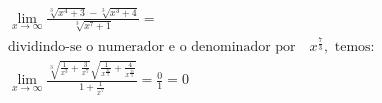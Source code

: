 \begin{ex}
\begin{align}
&\lim_{x\rightarrow \infty} \frac{\sqrt[3]{x^4+3}-\sqrt[3]{x^3+4}}{\sqrt[3]{x^7+1}}=\nonumber\\
&\text{dividindo-se o numerador e o denominador por}\quad{x^\frac{7}{3},}\text{ temos: }\nonumber\\
&\lim_{x\rightarrow \infty} \frac{\sqrt[3]{\frac{1}{x^3}+\frac{3}{x^7}}\sqrt{\frac{1}{x^\frac{26}{3}}+\frac{4}{x^\frac{35}{3}}}}{1+\frac{1}{x^7}}=\frac{0}{1}=0\nonumber
\end{align}
\end{ex}